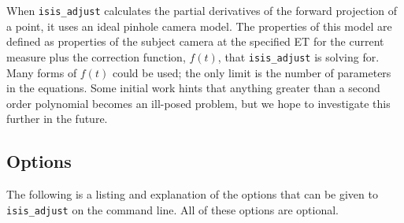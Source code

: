 When \texttt{isis\_adjust} calculates the partial derivatives of the
forward projection of a point, it uses an ideal pinhole camera model.
The properties of this model are defined as properties of the subject
camera at the specified \ac{ET} for the current measure plus the
correction function, $f(t)$, that \texttt{isis\_adjust} is solving
for.  Many forms of $f(t)$ could be used; the only limit is the
number of parameters in the equations. Some initial work hints that
anything greater than a second order polynomial becomes an ill-posed
problem, but we hope to investigate this further in the future.

\subsection{Options}

The following is a listing and explanation of the options
that can be given to \texttt{isis\_adjust} on the command line.  All of these
options are optional.

